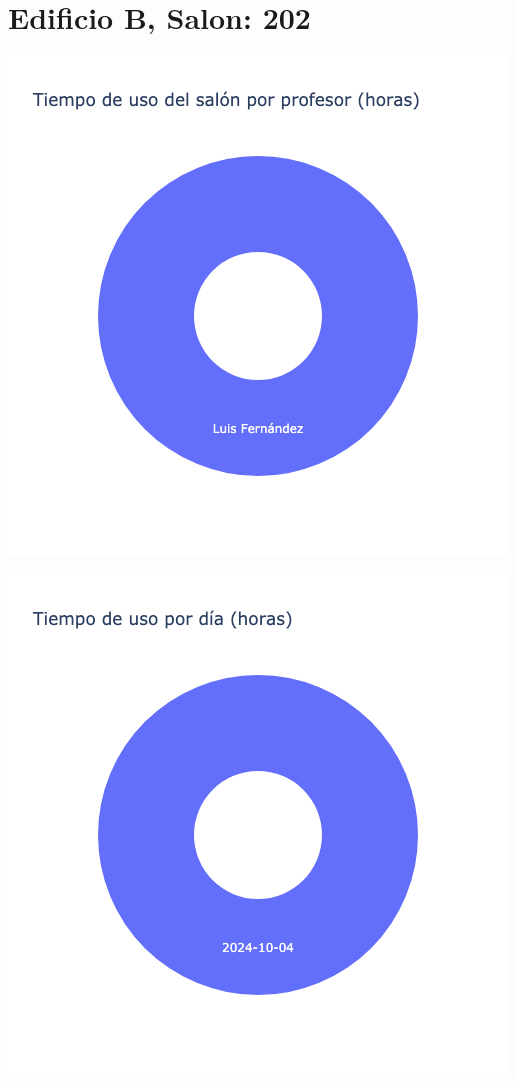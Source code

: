 \documentclass{article}
\begin{document}
    \section{Edificio B, Salon: 202}
    \noindent
    \begin{minipage}{0.48\textwidth}
        \centering
        \includegraphics[width=\textwidth]{../img/pie/UP202-90Dias-03-12-2024.png}
    \end{minipage}
    \hfill
    \begin{minipage}{0.48\textwidth}
        \centering
        \includegraphics[width=\textwidth]{../img/pie/UD202-90Dias-03-12-2024.png}
    \end{minipage}
    
\end{document}

